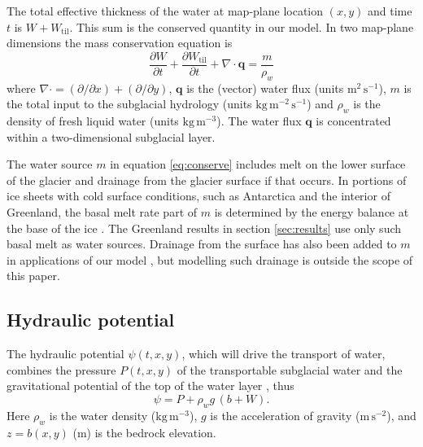 \documentclass[gmd]{copernicus}   %
\newcommand{\text}{\textrm}
\newcommand\bq{\mathbf{q}}
\newcommand{\Div}{\nabla\cdot}
\newcommand{\Wtil}{W_{\text{til}}}
\begin{document}
The total effective thickness of the water at map-plane location $(x,y)$ and time $t$ is $W + \Wtil$.  This sum is the conserved quantity in our model.  In two map-plane dimensions the mass conservation equation is \citep[compare][]{Clarke05}
\begin{equation} \label{eq:conserve}
\frac{\partial W}{\partial t} + \frac{\partial \Wtil}{\partial t} + \Div \bq = \frac{m}{\rho_w}
\end{equation}
where $\Div = (\partial/\partial x) + (\partial/\partial y)$, $\bq$ is the (vector) water flux (units $\text{m}^2\,\text{s}^{-1}$), $m$ is the total input to the subglacial hydrology (units $\text{kg}\,\text{m}^{-2}\,\text{s}^{-1}$) and $\rho_w$ is the density of fresh liquid water (units $\text{kg}\,\text{m}^{-3}$).  The water flux $\bq$ is concentrated within a two-dimensional subglacial layer.

The water source $m$ in equation \eqref{eq:conserve} includes melt on the lower surface of the glacier and drainage from the glacier surface if that occurs.  In portions of ice sheets with cold surface conditions, such as Antarctica and the interior of Greenland, the basal melt rate part of $m$ is determined by the energy balance at the base of the ice \citep{AschwandenBuelerKhroulevBlatter}.  The Greenland results in section \ref{sec:results} use only such basal melt as water sources.  Drainage from the surface has also been added to $m$ in applications of our model \citep{vanPeltthesis}, but modelling such drainage is outside the scope of this paper.

\subsection{Hydraulic potential}  The  hydraulic potential $\psi(t,x,y)$, which will drive the transport of water, combines the pressure $P(t,x,y)$ of the transportable subglacial water and the gravitational potential of the top of the water layer \citep{Goelleretal2013,Hewittetal2012}, thus
\begin{equation} \label{eq:potential}
\psi = P + \rho_w g\, (b+W).
\end{equation}
Here $\rho_w$ is the water density ($\text{kg}\,\text{m}^{-3}$), $g$ is the acceleration of gravity ($\text{m}\,\text{s}^{-2}$), and $z=b(x,y)$ ($\text{m}$) is the bedrock elevation.
\end{document}
